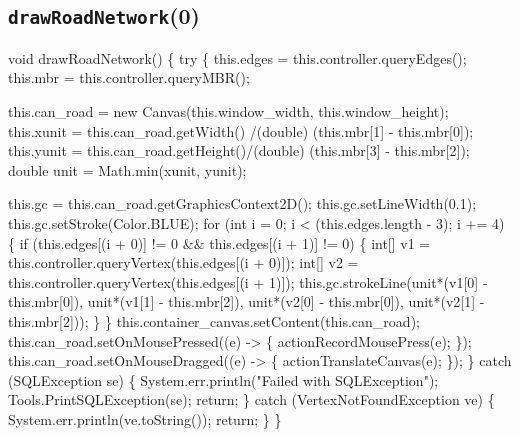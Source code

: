 \subsection{\texttt{drawRoadNetwork}(0)}
\nwenddocs{}\endmoddef{}
void drawRoadNetwork() \{
  try \{
    this.edges    = this.controller.queryEdges();
    this.mbr      = this.controller.queryMBR();

    this.can_road = new Canvas(this.window_width, this.window_height);
    this.xunit    = this.can_road.getWidth() /(double) (this.mbr[1] - this.mbr[0]);
    this.yunit    = this.can_road.getHeight()/(double) (this.mbr[3] - this.mbr[2]);
    double unit   = Math.min(xunit, yunit);

    this.gc = this.can_road.getGraphicsContext2D();
    this.gc.setLineWidth(0.1);
    this.gc.setStroke(Color.BLUE);
    for (int i = 0; i < (this.edges.length - 3); i += 4) \{
      if (this.edges[(i + 0)] != 0 && this.edges[(i + 1)] != 0) \{
        int[] v1 = this.controller.queryVertex(this.edges[(i + 0)]);
        int[] v2 = this.controller.queryVertex(this.edges[(i + 1)]);
        this.gc.strokeLine(unit*(v1[0] - this.mbr[0]), unit*(v1[1] - this.mbr[2]),
                           unit*(v2[0] - this.mbr[0]), unit*(v2[1] - this.mbr[2]));
      \}
    \}
    this.container_canvas.setContent(this.can_road);
    this.can_road.setOnMousePressed((e) -> \{ actionRecordMousePress(e); \});
    this.can_road.setOnMouseDragged((e) -> \{ actionTranslateCanvas(e); \});
  \} catch (SQLException se) \{
    System.err.println("Failed with SQLException");
    Tools.PrintSQLException(se);
    return;
  \} catch (VertexNotFoundException ve) \{
    System.err.println(ve.toString());
    return;
  \}
\}
\eatline
{}\nwendcode{}\nwdocspar
